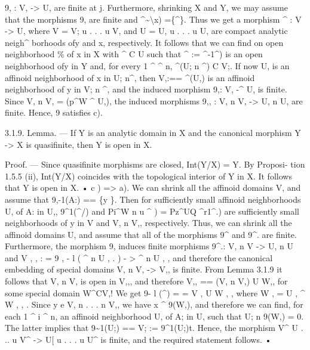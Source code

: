 \documentclass[
  10pt,
]{article}
\newenvironment{Shaded}{}{}
\newcommand{\NormalTok}[1]{#1}
\begin{document}
\begin{Shaded}
\begin{Highlighting}[]
\NormalTok{9,\textquotesingle{} : V,\textquotesingle{} {-}\textgreater{} U,\textquotesingle{} are finite at j. Furthermore, shrinking X and Y, we may assume that}
\NormalTok{the morphisms 9,\textquotesingle{} are finite and \^{}\textasciitilde{}\textbackslash{}x) =\{\^{}\}. Thus we get a morphism \^{} : V {-}\textgreater{} U,}
\NormalTok{where V = V; u . . . u V, and U = U, u . . . u U, are compact analytic neigh\^{}}
\NormalTok{borhoods ofy and x, respectively. It follows that we can find on open neighborhood \%}
\NormalTok{of x in X with \^{} C U such that \^{} := \^{}{-}1\^{}) is an open neighborhood ofy in Y and,}
\NormalTok{for every 1 \^{} \^{} n, \^{}(U; n \^{}) C V;. If now U, is an affinoid neighborhood of x in}
\NormalTok{U; n\^{}, then V,:== \^{}(U,) is an affinoid neighborhood of y in V; n \^{}, and the}
\NormalTok{induced morphism 9,: V, {-}\^{} U, is finite. Since V, n V, = (p\^{}W \^{} U,), the induced}
\NormalTok{morphisms 9,, : V, n V, {-}\textgreater{} U, n U, are finite. Hence, 9 satisfies c).}

\NormalTok{      3.1.9. Lemma. — If Y is an analytic domain in X and the canonical morphism Y {-}\textgreater{} X}
\NormalTok{is quasifinite, then Y is open in X.}

\NormalTok{        Proof. — Since quasifinite morphisms are closed, Int(Y/X) = Y. By Proposi{-}}
\NormalTok{tion 1.5.5 (ii), Int(Y/X) coincides with the topological interior of Y in X. It follows}
\NormalTok{that Y is open in X. •}
\NormalTok{        c ) =\textgreater{} a). We can shrink all the affinoid domains V, and assume that 9,{-}1(A:) == \{y \}.}
\NormalTok{Then for sufficiently small affinoid neighborhoods U,\textquotesingle{} of A: in U,, 9\^{}1(\^{}/) and}
\NormalTok{Pi\^{}W n u \^{} ) = Pz\textquotesingle{}\^{}UQ \^{}r1\^{}.) are sufficiently small neighborhoods of y in V}
\NormalTok{and V, n V,, respectively. Thus, we can shrink all the affinoid domains U, and assume}
\NormalTok{that all of the morphisms 9\^{} and 9\^{}. are finite.}
\NormalTok{        Furthermore, the morphism 9, induces finite morphisms 9\^{}.: V, n V {-}\textgreater{} U, n U}
\NormalTok{and V , , : = 9 , {-} l ( \^{} n U , . ) {-} \textgreater{} \^{} n U , , and therefore the canonical embedding of}
\NormalTok{special domains V, n V, {-}\textgreater{} V,, is finite. From Lemma 3.1.9 it follows that V, n V,}
\NormalTok{is open in V,,, and therefore V,, == (V, n V,) U W,, for some special domain W\^{}CV,!}
\NormalTok{We get 9{-} l (\^{}) = = V , U W , , where W , = U , \^{} W , , . Since y e V, n . . . n V,, we}
\NormalTok{have x \^{} 9(W,), and therefore we can find, for each 1 \^{} i \^{} n, an affinoid neighborhood U,\textquotesingle{}}
\NormalTok{of A; in U, such that U; n 9(W,) = 0. The latter implies that 9\textasciitilde{}1(U;) == V; := 9\^{}1(U;)t.}
\NormalTok{Hence, the morphism V\^{} U . .. u V\^{} {-}\textgreater{} U[ u . . . u U\^{} is finite, and the required}
\NormalTok{statement follows. •}


\end{Highlighting}
\end{Shaded}
\end{document}
